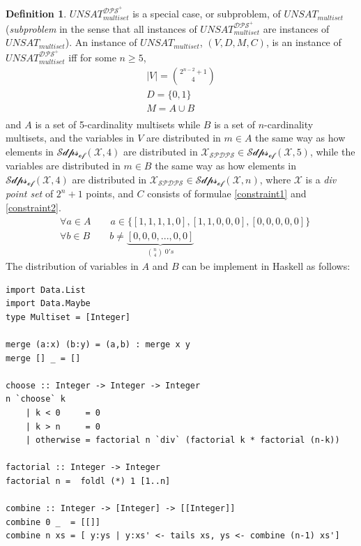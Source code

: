 \documentclass[11pt, oneside]{article}      %
\theoremstyle{definition}
\newtheorem{defn}{Definition}
\numberwithin{equation}{section}
\theoremstyle{c}
\begin{document}
\begin{defn}
$UNSAT_{multiset}^{\mathscr{DPS}^+}$ is a special case, or subproblem, of $UNSAT_{multiset}$ (\textit{subproblem} in the sense that all instances of $UNSAT_{multiset}^{\mathscr{DPS}^+}$ are instances of  $UNSAT_{multiset}$). An instance of $UNSAT_{multiset}$, $(V,D,M,C)$, is an instance of $UNSAT_{multiset}^{\mathscr{DPS}^+}$ iff for some $n \geq 5$,
\begin{equation}
\begin{gathered}
|V| =  \binom{2^{n-2}+1}{4} \\
D = \{0,1\} \\
M = A \cup B \\
\end{gathered}
\end{equation}
and $A$ is a set of 5-cardinality multisets while $B$ is a set of $n$-cardinality multisets, and the variables in $V$ are distributed in $m \in A$ the same way as how elements in $\mathscr{Sdps_{of}}(\mathscr{X},4)$ are distributed in $\mathscr{X_{SPDPS}} \in\mathscr{Sdps_{of}}(\mathscr{X},5)$, while the variables are distributed in $m \in B$ the same way as how elements in $\mathscr{Sdps_{of}}(\mathscr{X},4)$ are distributed in $\mathscr{X_{SPDPS}} \in\mathscr{Sdps_{of}}(\mathscr{X},n)$, where $\mathscr{X}$ is a \textit{div point set} of $2^n+1$ points, and $C$ consists of formulae \ref{constraint1} and \ref{constraint2}.
\begin{align}
\label{constraint1}
&\forall a \in A \qquad a \in \{ [1,1,1,1,0],  [1,1,0,0,0] ,[0,0,0,0,0] \} \\
\label{constraint2}
&\forall b \in B \qquad b \not =  \underbrace{[0,0,0,...,0,0]}_{\binom{n}{4} \; 0's}
\end{align}
The distribution of variables in $A$ and $B$ can be implement in Haskell as follows:
\begin{lstlisting}
import Data.List
import Data.Maybe
type Multiset = [Integer]

merge (a:x) (b:y) = (a,b) : merge x y
merge [] _ = []

choose :: Integer -> Integer -> Integer
n `choose` k
    | k < 0     = 0
    | k > n     = 0
    | otherwise = factorial n `div` (factorial k * factorial (n-k))

factorial :: Integer -> Integer
factorial n =  foldl (*) 1 [1..n]

combine :: Integer -> [Integer] -> [[Integer]]
combine 0 _  = [[]]
combine n xs = [ y:ys | y:xs' <- tails xs, ys <- combine (n-1) xs']


\end{lstlisting}
\end{defn}
\end{document}
